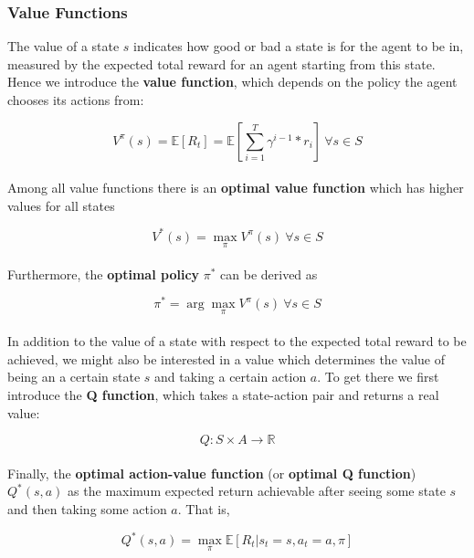 \subsubsection{Value Functions}

The value of a state $s$ indicates how good or bad a state is for the agent to be in, measured by the expected total reward for an agent starting from this state. Hence we introduce the \textbf{value function}, which depends on the policy the agent chooses its actions from:

\begin{equation}\label{eq:value-function}
V^{\pi}(s)=\mathbb{E}[R_t]=\mathbb{E}[\sum_{i=1}^{T}{\gamma^{i-1}{*}r_{i}}]\ \forall s \in S
\end{equation}
\\
Among all value functions there is an \textbf{optimal value function} which has higher values for all states

\begin{equation}\label{eq:optimal-value-function}
V^{*}(s)=\max_{\pi}V^{\pi}(s)\ \forall s \in S
\end{equation}
\\
Furthermore, the \textbf{optimal policy} $\pi^*$ can be derived as

\begin{equation}\label{eq:value-function-policy}
\pi^{*}=\arg\max_{\pi}V^{\pi}(s)\ \forall{s}\in{S}
\end{equation}
\\
In addition to the value of a state with respect to the expected total reward to be achieved, we might also be interested in a value which determines the value of being an a certain state $s$ and taking a certain action $a$. 
To get there we first introduce the \textbf{Q function}, which takes a state-action pair and returns a real value:

\begin{equation}\label{eq:q-function}
Q:S\times{A}\rightarrow{\mathbb{R}}
\end{equation}
\\
Finally, the \textbf{optimal action-value function} (or \textbf{optimal Q function}) $Q^*(s,a)$ as the maximum expected return achievable after seeing some state $s$ and then taking some action $a$. That is, 

\begin{equation}\label{eq:optimal-action-value-function}
Q^*(s,a)=\max_{\pi}\mathbb{E} [ R_t | s_t=s, a_t=a, \pi ]
\end{equation}

